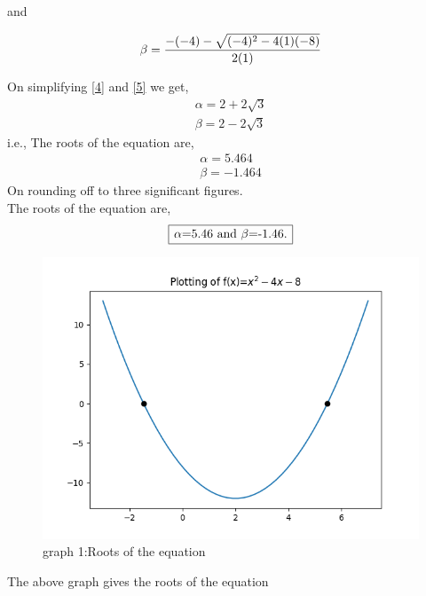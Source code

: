 \documentclass[journal,12pt,twocolumn]{IEEEtran}
\begin{document}
and

\begin{align} \label{5}
\beta =\Large \frac{-(-4)-\sqrt{(-4)^2-4(1)(-8)}}{2(1)}
\end{align}

On simplifying \eqref{4} and \eqref{5} we get,
\begin{align*}
\alpha=2+2\sqrt{3}  \\ \beta=2-2\sqrt{3} 
\end{align*}
i.e., The roots of the equation are,
\begin{align*}
\alpha=5.464   \\ \beta=-1.464
\end{align*}
On rounding off to three significant figures.
\\The roots of the equation are,
\begin{align*} 
\framebox[1.1\width]{$\alpha$=5.46 and $\beta$=-1.46.}
\end{align*}
\begin{figure}[h] 
\includegraphics[scale=0.65] 
{Figure_1}\large
\caption{graph 1:Roots of the equation}
\label{fig:a}
\end{figure}

\noindent The above graph \pageref{fig:a}   gives the roots of the equation 
\end{document}
